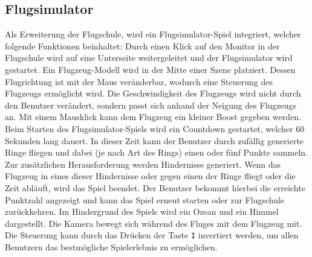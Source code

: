 \subsection{Flugsimulator}

Als Erweiterung der Flugschule, wird ein Flugsimulator-Spiel integriert, welcher folgende Funktionen beinhaltet:
\newparagraph
Durch einen Klick auf den Monitor in der Flugschule wird auf eine Unterseite weitergeleitet und der Flugsimulator wird gestartet.
Ein Flugzeug-Modell wird in der Mitte einer Szene platziert.
Dessen Flugrichtung ist mit der Maus veränderbar, wodurch eine Steuerung des Flugzeugs ermöglicht wird.
Die Geschwindigkeit des Flugzeugs wird nicht durch den Benutzer verändert, sondern passt sich anhand der Neigung des Flugzeugs an.
Mit einem Mausklick kann dem Flugzeug ein kleiner Boost gegeben werden.
\newparagraph
Beim Starten des Flugsimulator-Spiels wird ein Countdown gestartet, welcher 60 Sekunden lang dauert.
In dieser Zeit kann der Benutzer durch zufällig generierte Ringe fliegen und dabei (je nach Art des Rings) einen oder fünf Punkte sammeln.
Zur zusätzlichen Herausforderung werden Hindernisse generiert.
Wenn das Flugzeug in eines dieser Hindernisse oder gegen einen der Ringe fliegt oder die Zeit abläuft, wird das Spiel beendet.
Der Benutzer bekommt hierbei die erreichte Punktzahl angezeigt und kann das Spiel erneut starten oder zur Flugschule zurückkehren.
\newparagraph
Im Hindergrund des Spiels wird ein Ozean und ein Himmel dargestellt.
Die Kamera bewegt sich während des Fluges mit dem Flugzeug mit.
Die Steuerung kann durch das Drücken der Taste \texttt{I} invertiert werden, um allen Benutzern das bestmögliche Spielerlebnis zu ermöglichen.